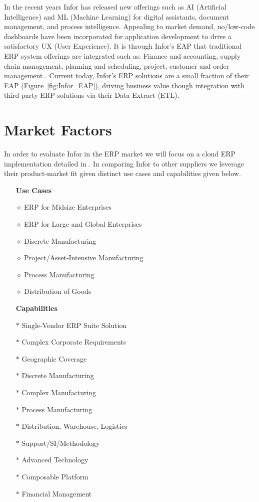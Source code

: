 \documentclass{article}
\begin{document}
In the recent years Infor has released new offerings such as AI (Artificial Intelligence) and ML (Machine Learning) for digital assistants, document management, and process intelligence. 
Appealing to market demand, no/low-code dashboards have been incorporated for application development to drive a satisfactory UX (User Experience).
It is through Infor's EAP that traditional ERP system offerings are integrated such as: Finance and accounting, supply chain management, planning and scheduling, project, customer and order management \cite{infor_erp, infor_eai_ml_os}. 
Current today, Infor's ERP solutions are a small fraction of their EAP (Figure~\ref{fig:Infor_EAP}), driving business value though integration with third-party ERP solutions via their Data Extract (ETL).

\section{Market Factors}
In order to evaluate Infor in the ERP market we will focus on a cloud ERP implementation detailed in \cite{critical_cloud_erp}. 
In comparing Infor to other suppliers we leverage their product-market fit given distinct use cases and capabilities given below.

\begin{multicols}{2}
\begin{itemize}
    \item[] \textbf{Use Cases}
    \item[$\diamond$] ERP for Midsize Enterprises
    \item[$\diamond$] ERP for Large and Global Enterprises
    \item[$\diamond$] Discrete Manufacturing
    \item[$\diamond$] Project/Asset-Intensive Manufacturing
    \item[$\diamond$] Process Manufacturing
    \item[$\diamond$] Distribution of Goods
\end{itemize}

\begin{itemize}
    \item[] \textbf{Capabilities}
    \item[$\ast$] Single-Vendor ERP Suite Solution
    \item[$\ast$] Complex Corporate Requirements
    \item[$\ast$] Geographic Coverage
    \item[$\ast$] Discrete Manufacturing
    \item[$\ast$] Complex Manufacturing
    \item[$\ast$] Process Manufacturing
    \item[$\ast$] Distribution, Warehouse, Logistics
    \item[$\ast$] Support/SI/Methodology
    \item[$\ast$] Advanced Technology
    \item[$\ast$] Composable Platform
    \item[$\ast$] Financial Management
\end{itemize}
\end{multicols}
\end{document}

